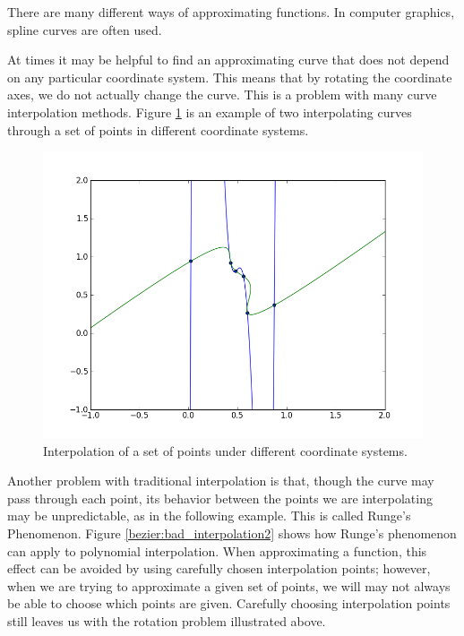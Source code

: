 

There are many different ways of approximating functions.
In computer graphics, spline curves are often used.

At times it may be helpful to find an approximating curve that does not depend on any particular coordinate system.
This means that by rotating the coordinate axes, we do not actually change the curve.
This is a problem with many curve interpolation methods.
Figure \ref{bezier:bad_interpolation} is an example of two interpolating curves through a set of points in different coordinate systems.

\begin{figure}
\includegraphics[width=.9\textwidth]{bad_interpolation}
\caption{Interpolation of a set of points under different coordinate systems.}
\label{bezier:bad_interpolation}
\end{figure}

Another problem with traditional interpolation is that, though the curve may pass through each point, its behavior between the points we are interpolating may be unpredictable, as in the following example.
This is called Runge's Phenomenon.
Figure \ref{bezier:bad_interpolation2} shows how Runge's phenomenon can apply to polynomial interpolation.
When approximating a function, this effect can be avoided by using carefully chosen interpolation points; however, when we are trying to approximate a given set of points, we will may not always be able to choose which points are given.
Carefully choosing interpolation points still leaves us with the rotation problem illustrated above.

